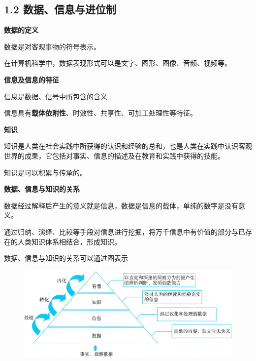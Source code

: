 \setcounter{section}{1}
\setcounter{subsection}{0}
\subsection{1.2 数据、信息与进位制}



\begin{compactenum}[1.]
\item \textbf{数据的定义}
	\begin{compactitem}
	\item 数据是对客观事物的符号表示。
	\item 在计算机科学中，数据表现形式可以是文字、图形、图像、音频、视频等。
	\end{compactitem}
\item \textbf{信息及信息的特征}
	\begin{compactitem}
	\item 信息是数据、信号中所包含的含义
	\item 信息具有\textbf{载体依附性}、时效性、共享性、可加工处理性等特征。
	\end{compactitem}
\item \textbf{知识}
	\begin{compactitem}
	\item 知识是人类在社会实践中所获得的认识和经验的总和，也是人类在实践中认识客观世界的成果，它包括对事实、信息的描述及在教育和实践中获得的技能。
	\item 知识是可以积累与传承的。
	\end{compactitem}
\item \textbf{数据、信息与知识的关系}
	\begin{compactitem}
	\item 数据经过解释后产生的意义就是信息，数据是信息的载体，单纯的数字是没有意义。
	\item 通过归纳、演绎、比较等手段对信息进行挖掘，将万千信息中有价值的部分与已存在的人类知识体系相结合，形成知识。
	\item 数据、信息与知识的关系可以通过图表示
	\end{compactitem}
\begin{figure}[!ht]
\centering
\includegraphics[width=0.5\linewidth]{pic/c01.01.info.knowledge}
\end{figure}



\end{compactenum}
